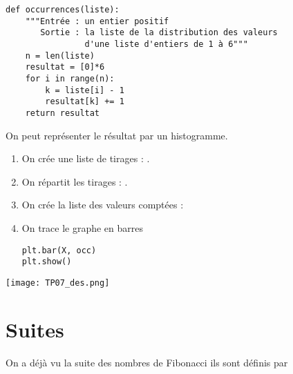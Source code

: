 \begin{Answer}
\begin{lstlisting}
def occurrences(liste):
 	"""Entrée : un entier positif
 	   Sortie : la liste de la distribution des valeurs
 	            d'une liste d'entiers de 1 à 6""" 
    n = len(liste)
    resultat = [0]*6
    for i in range(n):
        k = liste[i] - 1
        resultat[k] += 1
    return resultat
\end{lstlisting}
\end{Answer}

\medskip

\begin{minipage}[b]{0.55\textwidth}

On peut représenter le résultat par un histogramme.

\begin{enumerate}
\item On crée une liste de tirages : .
\item On répartit les tirages : .
\item On crée la liste des valeurs comptées : 
\item On trace le graphe en barres
\begin{lstlisting}
plt.bar(X, occ)
plt.show()
\end{lstlisting}
\end{enumerate}
\end{minipage}
\texttt{[image: TP07\_des.png]} 
\section{Suites} 
On a déjà vu la suite des nombres de Fibonacci ils sont définis par

